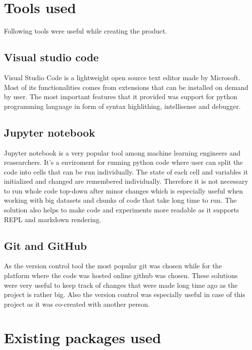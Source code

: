 \documentclass[a4paper,twoside,12pt]{book}
\begin{document}
\section{Tools used}

Following tools were useful while creating the product. 

\subsection{Visual studio code}

Visual Studio Code is a lightweight open source text editor made by Microsoft. Most of its functionalities comes from extensions that can be installed on demand by user. The most important features that it provided was support for python programming language in form of syntax highlithing, intellisense and debugger.


\subsection{Jupyter notebook}

Jupyter notebook is a very popular tool among machine learning engineers and reasearchers. It's a enviroment for running python code where user can split the code into cells that can be run individually. The state of each cell and variables it initialized and changed are remembered individually. Therefore it is not necessary to run whole code top-down after minor changes which is especially useful when working with big datasets and chunks of code that take long time to run.
The solution also helps to make code and experiments more readable as it supports REPL and markdown rendering.

\subsection{Git and GitHub}

As the version control tool the most popular git was chosen while for the platform where the code was hosted online github was chosen. These solutions were very useful to keep track of changes that were made long time ago as the project is rather big. Also the version control was especially useful in case of this project as it was co-created with another person.


\section{Existing packages used}
\end{document}
